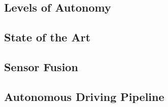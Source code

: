\subsection{Levels of Autonomy}
\label{subsec:background:labels_of_autonomy}

\subsection{State of the Art}
\label{subsec:background:state_of_the_art}

\subsection{Sensor Fusion}
\label{subsec:background:sensor_fusion}

\subsection{Autonomous Driving Pipeline}
\label{subsec:background:autonomous_driving_pipeline}
